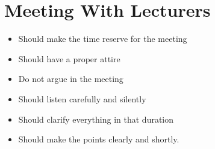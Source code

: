 \documentclass[12pt,a4paper]{article}
\begin{document}
\section{Meeting With Lecturers}
\begin{itemize}

\item Should make the time reserve for the meeting
\item Should have a proper attire
\item Do not argue in the meeting
\item Should listen carefully and silently
\item Should clarify everything in that duration
\item Should make the points clearly and shortly.
\end{itemize}


% 
\end{document}
